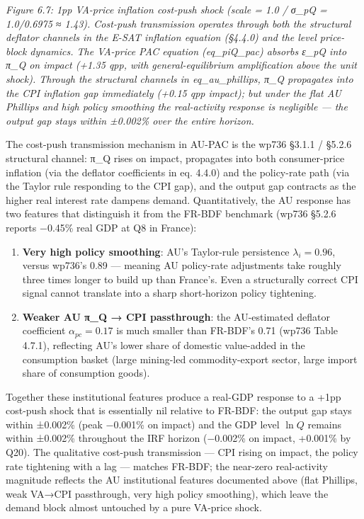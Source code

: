 \documentclass[
]{article}
\providecommand{\tightlist}{%
  \setlength{\itemsep}{0pt}\setlength{\parskip}{0pt}}
\begin{document}
\emph{Figure 6.7: 1pp VA-price inflation cost-push shock (scale = 1.0 /
σ\_pQ = 1.0/0.6975 ≈ 1.43). Cost-push transmission operates through both
the structural deflator channels in the E-SAT inflation equation
(§4.4.0) and the level price-block dynamics. The VA-price PAC equation
(eq\_piQ\_pac) absorbs ε\_pQ into π\_Q on impact (+1.35 qpp, with
general-equilibrium amplification above the unit shock). Through the
structural channels in eq\_au\_phillips, π\_Q propagates into the CPI
inflation gap immediately (+0.15 qpp impact); but under the flat AU
Phillips and high policy smoothing the real-activity response is
negligible --- the output gap stays within ±0.002\% over the entire
horizon.}

The cost-push transmission mechanism in AU-PAC is the wp736 §3.1.1 /
§5.2.6 structural channel: π\_Q rises on impact, propagates into both
consumer-price inflation (via the deflator coefficients in eq. 4.4.0)
and the policy-rate path (via the Taylor rule responding to the CPI
gap), and the output gap contracts as the higher real interest rate
dampens demand. Quantitatively, the AU response has two features that
distinguish it from the FR-BDF benchmark (wp736 §5.2.6 reports −0.45\%
real GDP at Q8 in France):

\begin{enumerate}
\def\labelenumi{\arabic{enumi}.}
\tightlist
\item
  \textbf{Very high policy smoothing}: AU's Taylor-rule persistence
  \(\lambda_i = 0.96\), versus wp736's 0.89 --- meaning AU policy-rate
  adjustments take roughly three times longer to build up than France's.
  Even a structurally correct CPI signal cannot translate into a sharp
  short-horizon policy tightening.
\item
  \textbf{Weaker AU π\_Q → CPI passthrough}: the AU-estimated deflator
  coefficient \(\alpha_{pc} = 0.17\) is much smaller than FR-BDF's 0.71
  (wp736 Table 4.7.1), reflecting AU's lower share of domestic
  value-added in the consumption basket (large mining-led
  commodity-export sector, large import share of consumption goods).
\end{enumerate}

Together these institutional features produce a real-GDP response to a
+1pp cost-push shock that is essentially nil relative to FR-BDF: the
output gap stays within ±0.002\% (peak −0.001\% on impact) and the GDP
level \(\ln Q\) remains within ±0.002\% throughout the IRF horizon
(−0.002\% on impact, +0.001\% by Q20). The qualitative cost-push
transmission --- CPI rising on impact, the policy rate tightening with a
lag --- matches FR-BDF; the near-zero real-activity magnitude reflects
the AU institutional features documented above (flat Phillips, weak
VA→CPI passthrough, very high policy smoothing), which leave the demand
block almost untouched by a pure VA-price shock.
\end{document}

